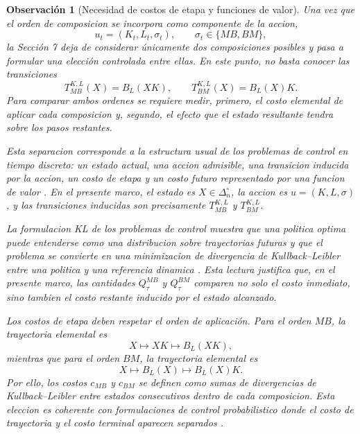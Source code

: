 \documentclass[12pt]{article}
\newtheorem{observacion}{Observación}[section]
\begin{document}
\begin{observacion}[Necesidad de costos de etapa y funciones de valor]\label{obs:necesidad_costos_valor_orden}
Una vez que el orden de composicion se incorpora como componente de la accion,
\[
u_t=(K_t,L_t,\sigma_t),
\qquad
\sigma_t\in\{MB,BM\},
\]
la Sección 7 deja de considerar únicamente dos composiciones posibles y pasa a formular una elección controlada entre ellas. En este punto, no basta conocer las transiciones
\[
T_{MB}^{K,L}(X)=B_L(XK),
\qquad
T_{BM}^{K,L}(X)=B_L(X)K.
\]
Para comparar ambos ordenes se requiere medir, primero, el costo elemental de aplicar cada composicion y, segundo, el efecto que el estado resultante tendra sobre los pasos restantes.

Esta separacion corresponde a la estructura usual de los problemas de control en tiempo discreto: un estado actual, una accion admisible, una transicion inducida por la accion, un costo de etapa y un costo futuro representado por una funcion de valor \citep{Todorov2009EfficientComputationOptimalActions}. En el presente marco, el estado es \(X\in\Delta_n^\circ\), la accion es \(u=(K,L,\sigma)\), y las transiciones inducidas son precisamente \(T_{MB}^{K,L}\) y \(T_{BM}^{K,L}\).

La formulacion KL de los problemas de control muestra que una politica optima puede entenderse como una distribucion sobre trayectorias futuras y que el problema se convierte en una minimizacion de divergencia de Kullback--Leibler entre una politica y una referencia dinamica \citep{KappenGomezOpper2012OptimalControlAsAGraphicalModelInferenceProblem}. Esta lectura justifica que, en el presente marco, las cantidades \(Q_\tau^{MB}\) y \(Q_\tau^{BM}\) comparen no solo el costo inmediato, sino tambien el costo restante inducido por el estado alcanzado.

Los costos de etapa deben respetar el orden de aplicación. Para el orden \(MB\), la trayectoria elemental es
\[
X
\longmapsto
XK
\longmapsto
B_L(XK),
\]
mientras que para el orden \(BM\), la trayectoria elemental es
\[
X
\longmapsto
B_L(X)
\longmapsto
B_L(X)K.
\]
Por ello, los costos \(c_{MB}\) y \(c_{BM}\) se definen como sumas de divergencias de Kullback--Leibler entre estados consecutivos dentro de cada composicion. Esta eleccion es coherente con formulaciones de control probabilistico donde el costo de trayectoria y el costo terminal aparecen separados \citep{Kappen2005LinearTheoryForControlOfNonLinearStochasticSystems}.


\end{observacion}
\end{document}
